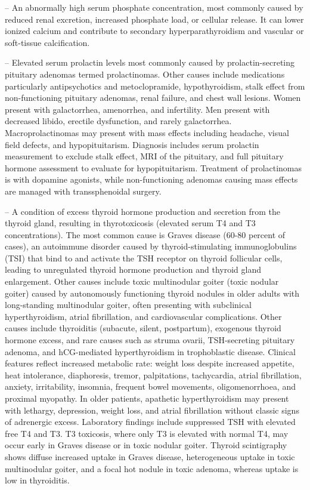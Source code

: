 -- An abnormally high serum phosphate concentration, most commonly caused by reduced renal excretion, increased phosphate load, or cellular release. It can lower ionized calcium and contribute to secondary hyperparathyroidism and vascular or soft-tissue calcification.

-- Elevated serum prolactin levels most commonly caused by prolactin-secreting pituitary adenomas termed prolactinomas. Other causes include medications particularly antipsychotics and metoclopramide, hypothyroidism, stalk effect from non-functioning pituitary adenomas, renal failure, and chest wall lesions. Women present with galactorrhea, amenorrhea, and infertility. Men present with decreased libido, erectile dysfunction, and rarely galactorrhea. Macroprolactinomas may present with mass effects including headache, visual field defects, and hypopituitarism. Diagnosis includes serum prolactin measurement to exclude stalk effect, MRI of the pituitary, and full pituitary hormone assessment to evaluate for hypopituitarism. Treatment of prolactinomas is with dopamine agonists, while non-functioning adenomas causing mass effects are managed with transsphenoidal surgery.

-- A condition of excess thyroid hormone production and secretion from the thyroid gland, resulting in thyrotoxicosis (elevated serum T4 and T3 concentrations). The most common cause is Graves disease (60-80 percent of cases), an autoimmune disorder caused by thyroid-stimulating immunoglobulins (TSI) that bind to and activate the TSH receptor on thyroid follicular cells, leading to unregulated thyroid hormone production and thyroid gland enlargement. Other causes include toxic multinodular goiter (toxic nodular goiter) caused by autonomously functioning thyroid nodules in older adults with long-standing multinodular goiter, often presenting with subclinical hyperthyroidism, atrial fibrillation, and cardiovascular complications. Other causes include thyroiditis (subacute, silent, postpartum), exogenous thyroid hormone excess, and rare causes such as struma ovarii, TSH-secreting pituitary adenoma, and hCG-mediated hyperthyroidism in trophoblastic disease. Clinical features reflect increased metabolic rate: weight loss despite increased appetite, heat intolerance, diaphoresis, tremor, palpitations, tachycardia, atrial fibrillation, anxiety, irritability, insomnia, frequent bowel movements, oligomenorrhoea, and proximal myopathy. In older patients, apathetic hyperthyroidism may present with lethargy, depression, weight loss, and atrial fibrillation without classic signs of adrenergic excess. Laboratory findings include suppressed TSH with elevated free T4 and T3. T3 toxicosis, where only T3 is elevated with normal T4, may occur early in Graves disease or in toxic nodular goiter. Thyroid scintigraphy shows diffuse increased uptake in Graves disease, heterogeneous uptake in toxic multinodular goiter, and a focal hot nodule in toxic adenoma, whereas uptake is low in thyroiditis.

